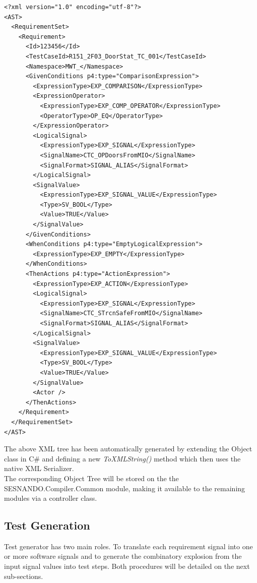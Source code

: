 \lstset{language=XML}
\begin{lstlisting}
<?xml version="1.0" encoding="utf-8"?>
<AST>
  <RequirementSet>
    <Requirement>
      <Id>123456</Id>
      <TestCaseId>R151_2F03_DoorStat_TC_001</TestCaseId>
      <Namespace>MWT_</Namespace>
      <GivenConditions p4:type="ComparisonExpression">
        <ExpressionType>EXP_COMPARISON</ExpressionType>
        <ExpressionOperator>
          <ExpressionType>EXP_COMP_OPERATOR</ExpressionType>
          <OperatorType>OP_EQ</OperatorType>
        </ExpressionOperator>
        <LogicalSignal>
          <ExpressionType>EXP_SIGNAL</ExpressionType>
          <SignalName>CTC_OPDoorsFromMIO</SignalName>
          <SignalFormat>SIGNAL_ALIAS</SignalFormat>
        </LogicalSignal>
        <SignalValue>
          <ExpressionType>EXP_SIGNAL_VALUE</ExpressionType>
          <Type>SV_BOOL</Type>
          <Value>TRUE</Value>
        </SignalValue>
      </GivenConditions>
      <WhenConditions p4:type="EmptyLogicalExpression">
        <ExpressionType>EXP_EMPTY</ExpressionType>
      </WhenConditions>
      <ThenActions p4:type="ActionExpression">
        <ExpressionType>EXP_ACTION</ExpressionType>
        <LogicalSignal>
          <ExpressionType>EXP_SIGNAL</ExpressionType>
          <SignalName>CTC_STrcnSafeFromMIO</SignalName>
          <SignalFormat>SIGNAL_ALIAS</SignalFormat>
        </LogicalSignal>
        <SignalValue>
          <ExpressionType>EXP_SIGNAL_VALUE</ExpressionType>
          <Type>SV_BOOL</Type>
          <Value>TRUE</Value>
        </SignalValue>
        <Actor />
      </ThenActions>
    </Requirement>
  </RequirementSet>
</AST>
\end{lstlisting}

The above XML tree has been automatically generated by extending the Object class in C\# and defining a new \textit{ToXMLString()} method which then uses the native XML Serializer.\\
The corresponding Object Tree will be stored on the the SESNANDO.Compiler.Common module, making it available to the remaining modules via a controller class.


\subsection{Test Generation}
\label{subsec:test_generation}

Test generator has two main roles. To translate each requirement signal into one or more software signals and to generate the combinatory explosion from the input signal values into test steps. Both procedures will be detailed on the next sub-sections.


